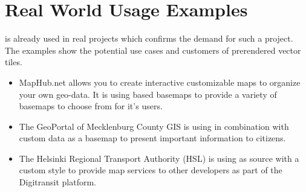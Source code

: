 \section{Real World Usage Examples}\label{part1_examples}

\osmvt{} is already used in real projects which confirms the demand for such a project. The examples show the potential use cases and customers of prerendered vector tiles.


\begin{itemize}
    \item MapHub.net allows you to create interactive customizable maps to organize your own geo-data. It is using \osmvt{} based basemaps to provide a variety of basemaps to choose from for it’s users.
    \item The GeoPortal of Mecklenburg County GIS is using \osmvt{} in combination with custom data as a basemap to present important information to citizens.
    \item The Helsinki Regional Transport Authority (HSL) is using \osmvt{} as source with a custom style to provide map services to other developers as part of the Digitransit platform.
\end{itemize}
